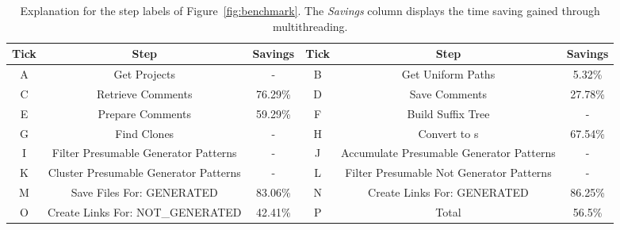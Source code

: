 \setlength{\extrarowheight}{.0em}
\begin{table}
	\caption[Explanation for the step labels of Figure~\ref{fig:benchmark}.]{Explanation for the step labels of Figure~\ref{fig:benchmark}. The \textit{Savings} column displays the time saving gained through multithreading.}
	\label{table:tickLabels}
		\begin{tabularx}{\textwidth}{c|C|c|||c|C|c}
			\textbf{Tick} & \textbf{Step} & \textbf{Savings} & \textbf{Tick} & \textbf{Step} & \textbf{Savings}\\
			\hline
			A & Get Projects & - & B & Get Uniform Paths & 5.32\% \\
			C & Retrieve Comments & 76.29\% & D & Save Comments & 27.78\% \\
			E & Prepare Comments & 59.29\% &F& Build Suffix Tree & - \\
			G& Find Clones & - & H & Convert to s & 67.54\%\\
			I&Filter Presumable Generator Patterns & - &J&Accumulate Presumable Generator Patterns & -\\
			K&Cluster Presumable Generator Patterns & - &L&Filter Presumable Not Generator Patterns & -\\
			M& Save Files For: GENERATED& 83.06\% &N&Create Links For: GENERATED & 86.25\%\\
			O& Create Links For: NOT\_GENERATED& 42.41\% & P & Total & 56.5\%
		\end{tabularx}
\end{table}
\setlength{\extrarowheight}{0em}